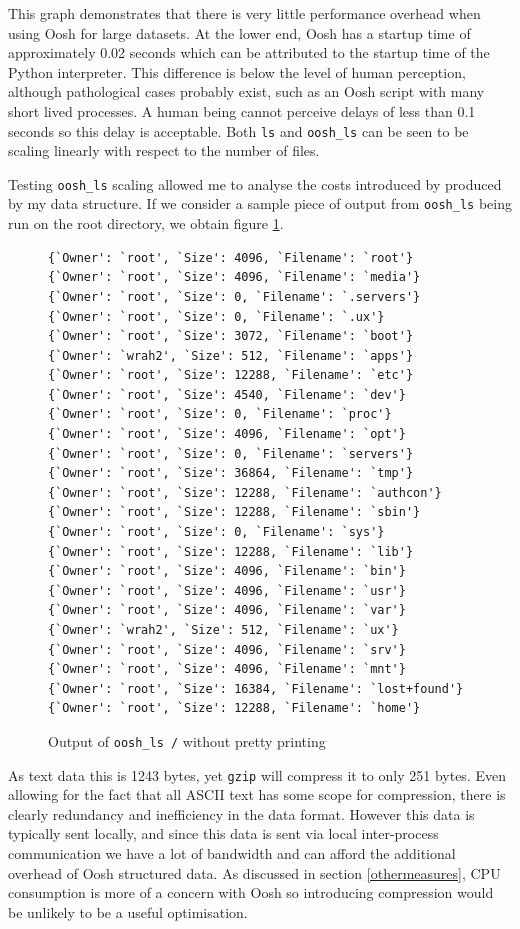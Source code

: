 \documentclass[12pt,twoside,notitlepage]{report}
\begin{document}
This graph demonstrates that there is very little performance overhead
when using Oosh for large datasets. At the lower end, Oosh has a
startup time of approximately 0.02 seconds which can be attributed to
the startup time of the Python interpreter. This difference is below
the level of human perception, although pathological cases probably
exist, such as an Oosh script with many short lived processes. A human
being cannot perceive delays of less than 0.1 seconds  \cite{hci}
so this delay is acceptable. Both {\tt ls} and {\tt oosh\_ls} can be
seen to be scaling linearly with respect to the number of files.

Testing {\tt oosh\_ls} scaling allowed me to analyse the costs
introduced by produced by my data structure. If we consider a sample
piece of output from {\tt oosh\_ls} being run on the root directory,
we obtain figure \ref{lsroot}.

\begin{figure}
\begin{verbatim}
{`Owner': `root', `Size': 4096, `Filename': `root'}
{`Owner': `root', `Size': 4096, `Filename': `media'}
{`Owner': `root', `Size': 0, `Filename': `.servers'}
{`Owner': `root', `Size': 0, `Filename': `.ux'}
{`Owner': `root', `Size': 3072, `Filename': `boot'}
{`Owner': `wrah2', `Size': 512, `Filename': `apps'}
{`Owner': `root', `Size': 12288, `Filename': `etc'}
{`Owner': `root', `Size': 4540, `Filename': `dev'}
{`Owner': `root', `Size': 0, `Filename': `proc'}
{`Owner': `root', `Size': 4096, `Filename': `opt'}
{`Owner': `root', `Size': 0, `Filename': `servers'}
{`Owner': `root', `Size': 36864, `Filename': `tmp'}
{`Owner': `root', `Size': 12288, `Filename': `authcon'}
{`Owner': `root', `Size': 12288, `Filename': `sbin'}
{`Owner': `root', `Size': 0, `Filename': `sys'}
{`Owner': `root', `Size': 12288, `Filename': `lib'}
{`Owner': `root', `Size': 4096, `Filename': `bin'}
{`Owner': `root', `Size': 4096, `Filename': `usr'}
{`Owner': `root', `Size': 4096, `Filename': `var'}
{`Owner': `wrah2', `Size': 512, `Filename': `ux'}
{`Owner': `root', `Size': 4096, `Filename': `srv'}
{`Owner': `root', `Size': 4096, `Filename': `mnt'}
{`Owner': `root', `Size': 16384, `Filename': `lost+found'}
{`Owner': `root', `Size': 12288, `Filename': `home'}
\end{verbatim}
\caption{Output of {\tt oosh\_ls /} without pretty printing}
\label{lsroot}
\end{figure}

As text data this is 1243 bytes, yet {\tt gzip} will compress it to
only 251 bytes. Even allowing for the fact that all ASCII text has
some scope for compression, there is clearly redundancy and inefficiency in the
data format. However this data is typically sent locally, and since
this data is sent via local inter-process communication we have a lot
of bandwidth and can afford the additional overhead of Oosh structured
data. As discussed in section \ref{othermeasures}, CPU consumption is
more of a concern with Oosh so introducing compression would be
unlikely to be a useful optimisation.
\end{document}
